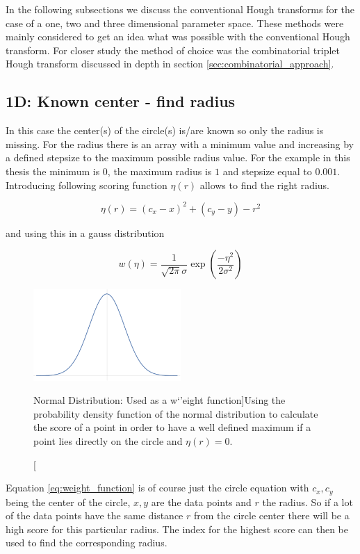 \documentclass[11pt,twoside]{scrreprt}
\begin{document}
In the following subsections we discuss the conventional Hough transforms for the case of a one, two and three dimensional parameter space. These
methods were mainly considered to get an idea what was possible with the conventional Hough transform. For closer study the method of choice was
the combinatorial triplet Hough transform discussed in depth in section \ref{sec:combinatorial_approach}.

\subsection{1D: Known center - find radius} %
\label{sub:1d_known_center_find_radius}

In this case the center(s) of the circle(s) is/are known so only the radius is missing. For the radius there is an array with a minimum value
and increasing by a defined stepsize to the maximum possible radius value. For the example in this thesis the minimum is $0$, the maximum radius
is $1$ and stepsize equal to $0.001$. Introducing following scoring function $\eta(r)$ allows to find the right radius.

\begin{equation}
\label{eq:score_function}
  \eta(r) = (c_x - x)^2 + (c_y - y) - r ^ 2
\end{equation}

and using this in a gauss distribution

\begin{equation}
\label{eq:weight_function}
  w(\eta) = \frac{1}{\sqrt{2\pi}\sigma}\exp\left( \frac{-\eta^2}{2\sigma^2}\right)
\end{equation}
\begin{figure}[tb]
  \centering
  \includegraphics[width=0.5\textwidth]{pics/gauss}
  \caption[Normal Distribution: Used as a w`'eight function]{Using the probability density function of the normal distribution to calculate the score of a point in order to have a well defined maximum if a point
  lies directly on the circle and $\eta(r) = 0$. }
  \label{fig:gauss}
\end{figure}
Equation \ref{eq:weight_function} is of course just the circle equation with $c_x, c_y$ being the center of the circle, $x, y$ are the data points and $r$ the radius.
So if a lot of the data points have the same distance $r$ from the circle center there will be a high score for this particular radius. The index
for the highest score can then be used to find the corresponding radius.
\end{document}
